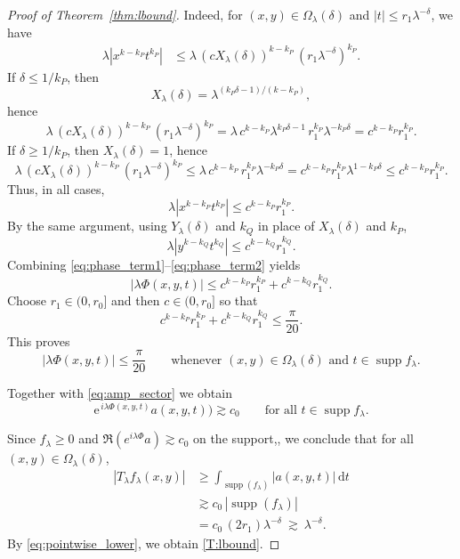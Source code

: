 \documentclass[10pt]{amsart}
\numberwithin{equation}{section}
\theoremstyle{definition}
\theoremstyle{remark}
\theoremstyle{remark}
\newcommand{\e}{\mathrm{e}}
\newcommand{\supp}{\operatorname{supp}}
\begin{document}
\begin{proof}[Proof of Theorem~\ref{thm:lbound}]
		Indeed, for $(x,y)\in\Omega_\lambda(\delta)$ and $|t|\le r_1\lambda^{-\delta}$, we have
		\begin{align*}
			\lambda|x^{k-k_P}t^{k_P}|
			&\le \lambda\,(cX_\lambda(\delta))^{k-k_P}\,(r_1\lambda^{-\delta})^{k_P}.
		\end{align*}
		If $\delta\le 1/k_P$, then
		\[
		X_\lambda(\delta)=\lambda^{(k_P\delta-1)/(k-k_P)},
		\]
		hence
		\[
		\lambda\,(cX_\lambda(\delta))^{k-k_P}\,(r_1\lambda^{-\delta})^{k_P}
		=\lambda\,c^{k-k_P}\lambda^{k_P\delta-1}\,r_1^{k_P}\lambda^{-k_P\delta}
		=c^{k-k_P}r_1^{k_P}.
		\]
		If $\delta\ge 1/k_P$, then $X_\lambda(\delta)=1$, hence
		\[
		\lambda\,(cX_\lambda(\delta))^{k-k_P}\,(r_1\lambda^{-\delta})^{k_P}
		\le \lambda\,c^{k-k_P}\,r_1^{k_P}\lambda^{-k_P\delta}
		=c^{k-k_P}r_1^{k_P}\lambda^{1-k_P\delta}
		\le c^{k-k_P}r_1^{k_P}.
		\]
		Thus, in all cases,
		\begin{equation}\label{eq:phase_term1}
			\lambda|x^{k-k_P}t^{k_P}|\le c^{k-k_P}r_1^{k_P}.
		\end{equation}
		By the same argument, using $Y_\lambda(\delta)$ and $k_Q$ in place of $X_\lambda(\delta)$ and $k_P$,
		\begin{equation}\label{eq:phase_term2}
			\lambda|y^{k-k_Q}t^{k_Q}|\le c^{k-k_Q}r_1^{k_Q}.
		\end{equation}
		Combining \eqref{eq:phase_term1}--\eqref{eq:phase_term2} yields
		\[
		|\lambda\Phi(x,y,t)|
		\le c^{k-k_P}r_1^{k_P}+c^{k-k_Q}r_1^{k_Q}.
		\]
		Choose $r_1\in(0,r_0]$ and then $c\in(0,r_0]$ so that
		\[
		c^{k-k_P}r_1^{k_P}+c^{k-k_Q}r_1^{k_Q}\le \frac{\pi}{20}.
		\]
		This proves \begin{equation*}
		 	|\lambda\Phi(x,y,t)|\le \frac{\pi}{20}
		 	\qquad\text{whenever }(x,y)\in\Omega_\lambda(\delta)\text{ and }t\in\supp f_\lambda.
		 \end{equation*}
		
	
		Together with \eqref{eq:amp_sector} we obtain
		\begin{equation*}
			\e^{\,i\lambda\Phi(x,y,t)}a(x,y,t)\bigr)
			\gtrsim c_0
			\qquad \text{for all }t\in\supp f_\lambda.
		\end{equation*}

		Since
        $f_\lambda\ge0$
        and
        $\Re(e^{i\lambda\Phi}a)\gtrsim c_0$
        on the support,, we conclude that for all
		$(x,y)\in\Omega_\lambda(\delta)$,
		\begin{align}
			|T_\lambda f_\lambda(x,y)|
			&\ge
			 \int_{\supp (f_\lambda)}|a(x,y,t)|\,\mathrm dt\nonumber\\
			&\gtrsim c_0\,|\supp (f_\lambda)|\nonumber\\
			&= c_0\,(2r_1)\lambda^{-\delta}
			\ \gtrsim\ \lambda^{-\delta}.\label{eq:pointwise_lower}
		\end{align}
		By \eqref{eq:pointwise_lower}, we obtain \eqref{T:lbound}.
		

\end{proof}
\end{document}
